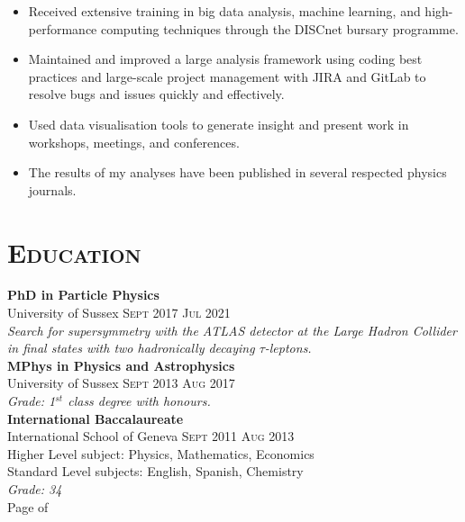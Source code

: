 \documentclass[oneside]{article}
\begin{document}
{\begin{minipage}[t][\dimexpr\textheight-2\fboxrule-2\fboxsep\relax][t]{\dimexpr0.6\textwidth-2\fboxrule-2\fboxsep\relax}
{\begin{itemize}
            \item Received extensive training in big data analysis, machine learning, and high-performance computing techniques through the DISCnet bursary programme.
            \item Maintained and improved a large analysis framework using coding best practices and large-scale project management with JIRA and GitLab to resolve bugs and issues quickly and effectively.
            \item Used data visualisation tools to generate insight and present work in workshops, meetings, and conferences.
            \item The results of my analyses have been published in several respected physics journals.
        \end{itemize}
        }
        \section*{\scshape\Large Education \hrulefill}
%
        {\large \textbf{PhD in Particle Physics}} \\ {University of Sussex}\hfill
        {\scshape{}\selectfont\footnotesize Sept 2017 \textendash{} Jul 2021} \\
        {\textit{Search for supersymmetry with the ATLAS detector at the Large Hadron Collider in final states with two hadronically decaying $\tau$-leptons.}} \\
        
        {\large \textbf{MPhys in Physics and Astrophysics}} \\ {University of Sussex} \hfill
        {\scshape{}\selectfont\footnotesize Sept 2013 \textendash{} Aug 2017} \\
        {\textit{Grade: 1$^{st}$ class degree with honours.}} \\

        {\large \textbf{International Baccalaureate}} \\ {International School of Geneva}\hfill
        {\scshape{}\selectfont\footnotesize Sept 2011 \textendash{} Aug 2013} \\
        {\footnotesize Higher Level subject: Physics, Mathematics, Economics} \\
        {\footnotesize Standard Level subjects: English, Spanish, Chemistry} \\
        {\textit{Grade: 34}} \\
        \vfill%
        {\hfill\small{}\selectfont Page \thepage of \pageref{LastPage}\hfill}
    \end{minipage}
}
\end{document}
